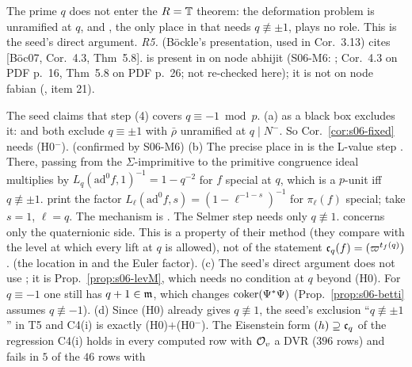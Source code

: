 \noindent The prime $q$ does not enter the $R=\mathbb{T}$ theorem: the deformation problem is unramified at $q$, and \cite[Prop.~2.15(1), p.~8]{KO},
the only place in \cite{KO} that needs $q\not\equiv\pm1$, plays no role. This is the seed's direct argument. \emph{R5.} \cite[Thm~3.12]{KO}
(Böckle's presentation, used in Cor.~3.13) cites [Böc07, Cor.~4.3, Thm~5.8]. \cite{Boc07} is present in  on node
abhijit (S06-M6: ; Cor.~4.3 on PDF p.~16, Thm~5.8 on PDF p.~26; not
re-checked here); it is not on node fabian (, item 21).

\begin{remark}\label{rem:s06-minus1}
The seed claims that step (4) covers $q\equiv-1\bmod p$.
(a) \cite[Thm~1.1]{KO} as a black box excludes it: \cite[Thm~1.1(6), p.~1]{KO} and \cite[(CR)(2), p.~2]{PW}
 both exclude
$q\equiv\pm1$ with $\bar\rho$ unramified at $q\mid N^-$. So Cor.~\ref{cor:s06-fixed} needs (H0$^-$). \stcited{} (confirmed by S06-M6)
(b) The precise place in \cite{KO} is the L-value step \cite[Prop.~2.15(1), p.~8]{KO}
. There, passing from the $\Sigma$-imprimitive to the primitive congruence ideal multiplies by
$L_q(\mathrm{ad}^0f,1)^{-1}=1-q^{-2}$ for $f$ special at $q$, which is a $p$-unit iff $q\not\equiv\pm1$. \cite[\S5.1, p.~18]{KO} print the factor
$L_\ell(\mathrm{ad}^0f,s)=(1-\ell^{-1-s})^{-1}$ for $\pi_\ell(f)$ special; take $s=1$, $\ell=q$. The mechanism is \cite[\S5, Prop.~5.6, p.~19]{KO}. The Selmer step \cite[Thm~2.13, p.~7]{KO} needs only
$q\not\equiv1$. \cite[Rem.~5.5]{KO} concerns only the quaternionic side. This is a property of their method (they compare with the level at
which every lift at $q$ is allowed), not of the statement $\mathfrak{c}_q(f)=(\varpi^{t_f(q)})$. \stcited{} (the location in \cite{KO} and the Euler
factor).
(c) The seed's direct argument does not use \cite[Thm~1.1]{KO}; it is Prop.~\ref{prop:s06-levM}, which needs no condition at $q$ beyond (H0).
For $q\equiv-1$ one still has $q+1\in\mathfrak{m}$, which changes $\operatorname{coker}(\Psi^*\Psi)$ (Prop.~\ref{prop:s06-betti} assumes $q\not\equiv-1$).
(d) Since (H0) already gives $q\not\equiv1$, the seed's exclusion ``$q\not\equiv\pm1$'' in T5 and C4(i) is exactly (H0)$+$(H0$^-$). The
Eisenstein form $(h)\supseteq\mathfrak{c}_q$ of the regression C4(i) holds in every computed row with $\mathcal{O}_v$ a DVR ($396$ rows) and fails in $5$ of the $46$ rows with

\end{remark}
